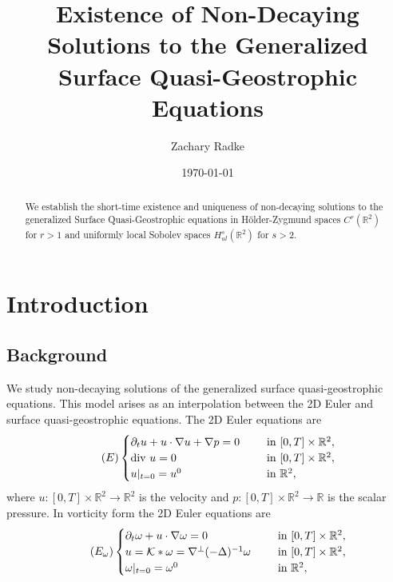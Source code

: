 \documentclass[12pt,xcolor=svgnames]{amsart}
\title[Non-Decaying Solutions to generalized SQG]{Existence of Non-Decaying Solutions to the Generalized Surface Quasi-Geostrophic Equations}
\author{Zachary Radke }
\date{\today}
\newcommand{\R}{\mathbb{R}}
\begin{document}
\maketitle

\begin{abstract}
We establish the short-time existence and uniqueness of non-decaying solutions to the generalized Surface Quasi-Geostrophic equations in Hölder-Zygmund spaces $C^r(\R^2)$ for $r>1$ and uniformly local Sobolev spaces $H_{ul}^s(\R^2)$ for $s>2$.
\end{abstract}

\section{Introduction}
\subsection{Background}
We study non-decaying solutions of the generalized surface quasi-geostrophic equations. This model arises as an interpolation between the 2D Euler and surface quasi-geostrophic equations. The 2D Euler equations are
\begin{equation}
\label{Euler Velocity}
\tag{$E$}
\begin{cases}
    \partial_t u + u\cdot \nabla u + \nabla p=0 \hspace{.5cm} &\text{in } [0,T]\times\R^2,\\
    \text{div }u=0 \hspace{.5cm} &\text{in } [0,T]\times\R^2, \\
    u\vert_{t=0}=u^0 \hspace{.5cm} &\text{in } \R^2,
\end{cases}
\end{equation}
where $u:[0,T]\times \R^2 \to \R^2$ is the velocity and $p:[0,T]\times\R^2 \to \R$ is the scalar pressure. In vorticity form the 2D Euler equations are
\begin{equation}
\label{Euler Vorticity}
\tag{$E_{\omega}$}
\begin{cases}
\partial_t \omega + u \cdot \nabla \omega = 0 \hspace{.5cm}& \text{in } [0,T] \times \R^2, \\
u = \mathcal{K} \ast \omega = \nabla^{\perp}(-\Delta)^{-1}\omega \hspace{.5cm} &\text{in } [0,T] \times \R^2, \\
\omega \vert_{t=0} = \omega^0 \hspace{.5cm} &\text{in } \R^2,
\end{cases}
\end{equation} 
\end{document}
